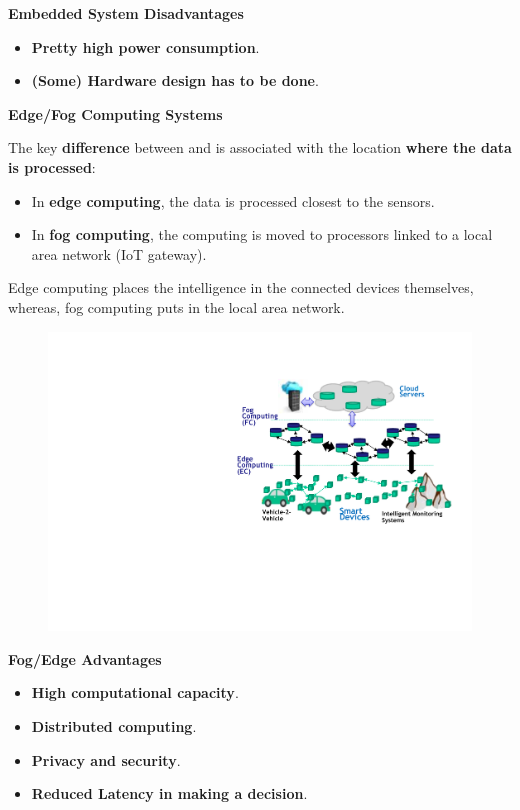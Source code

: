\begin{flushleft}
    \textcolor{Red2}{ \textbf{Embedded System Disadvantages}}
\end{flushleft}
\begin{itemize}
    \item \textbf{Pretty high power consumption}.
    \item \textbf{(Some) Hardware design has to be done}.
\end{itemize}

\newpage

\begin{center}
    \large
    \textcolor{Red3}{\textbf{Edge/Fog Computing Systems}}
\end{center}

\noindent
The key \textbf{difference} between  and  is associated with the location \textbf{where the data is processed}:
\begin{itemize}
    \item In \textbf{edge computing}, the data is processed closest to the sensors.

    \item In \textbf{fog computing}, the computing is moved to processors linked to a local area network (IoT gateway).
\end{itemize}
Edge computing places the intelligence in the connected devices themselves, whereas, fog computing puts in the local area network.

\begin{figure}[!htp]
    \centering
    \includegraphics[width=.8\textwidth]{img/edge-fog-computing-systems-1.pdf}
\end{figure}

\begin{flushleft}
    \textcolor{Green3}{ \textbf{Fog/Edge Advantages}}
\end{flushleft}
\begin{itemize}
    \item \textbf{High computational capacity}.
    \item \textbf{Distributed computing}.
    \item \textbf{Privacy and security}.
    \item \textbf{Reduced Latency in making a decision}.
\end{itemize}

